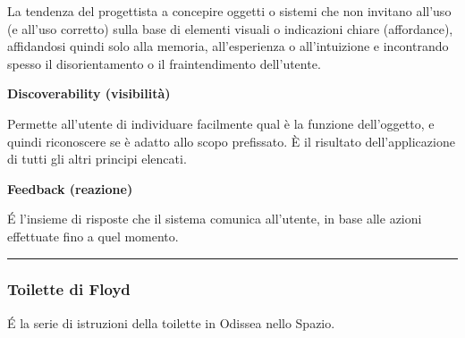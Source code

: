\documentclass[11pt,a4paper]{book}
\begin{document}
La tendenza del progettista a concepire oggetti o sistemi che non invitano all'uso (e all'uso corretto) sulla base di elementi visuali o indicazioni chiare (affordance), affidandosi quindi solo alla memoria, all'esperienza o all'intuizione e incontrando spesso il disorientamento o il fraintendimento dell'utente.

\begin{center}
	\textbf{Discoverability (visibilità)}
\end{center}

Permette all’utente di individuare facilmente qual è la funzione dell’oggetto, e quindi riconoscere se è adatto allo scopo prefissato. È il risultato dell’applicazione di tutti gli altri principi elencati.

\begin{center}
	\textbf{Feedback (reazione)}
\end{center}

É l’insieme di risposte che il sistema comunica all’utente, in base alle azioni effettuate fino a quel momento.

\noindent\rule{\textwidth}{1pt}

\subsubsection{Toilette di Floyd}
É la serie di istruzioni della toilette in Odissea nello Spazio.
\end{document}
